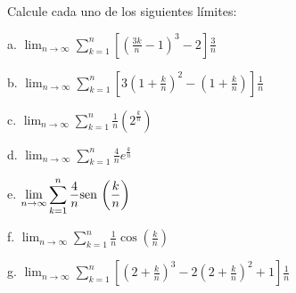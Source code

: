 


\begin{ejer}{Calcule cada uno de los siguientes límites:}

{\small
a. $\displaystyle\lim_{n\rightarrow \infty }\sum_{k=1}^{n}\left[ \left( \frac{3k}{n}-1\right) ^{3}-2\right] \frac{3}{n}$


b. $\displaystyle\lim_{n\rightarrow \infty }\sum_{k=1}^{n}\left[ 3\left( 1+\frac{k}{n}\right) ^{2}-\left( 1+\frac{k}{n}\right) \right] \frac{1}{n}$


c. $\displaystyle\lim_{n\rightarrow \infty }\sum_{k=1}^{n}\frac{1}{n}\left( 2^{\frac{k}{n}}\right)$


d. $\displaystyle\lim_{n\rightarrow \infty }\sum_{k=1}^{n}\frac{4}{n}e^{\frac{k}{n}}$


e. $\displaystyle\lim_{n\rightarrow \infty }\sum_{k=1}^{n}\frac{4}{n}\text{\rm sen}\, \left( \frac{k}{n} \right)$


f. $\displaystyle\lim_{n\rightarrow \infty }\sum_{k=1}^{n}\frac{1}{n}\cos \left( \frac{k}{n} \right)$


g. $\displaystyle\lim_{n\rightarrow \infty}\sum_{k=1}^{n}\left[ \left( 2+\frac{k}{n}\right) ^{3}-2\left( 2+\frac{k}{n}\right) ^{2}+1\right] \frac{1}{n}$
}
\end{ejer}





